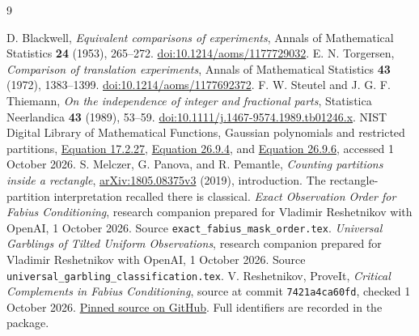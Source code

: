 \documentclass[11pt,a4paper]{article}
\theoremstyle{remark}\newtheorem*{ednote}{Editorial note (ProveIt, 2026-10-01)}
\begin{document}
\begin{thebibliography}{9}\small\raggedright
\setlength{\itemsep}{3pt}\setlength{\parskip}{0pt}
 D. Blackwell, \emph{Equivalent comparisons of experiments}, Annals of Mathematical Statistics \textbf{24} (1953), 265--272. \href{https://doi.org/10.1214/aoms/1177729032}{doi:10.1214/aoms/1177729032}.
 E. N. Torgersen, \emph{Comparison of translation experiments}, Annals of Mathematical Statistics \textbf{43} (1972), 1383--1399. \href{https://doi.org/10.1214/aoms/1177692372}{doi:10.1214/aoms/1177692372}.
 F. W. Steutel and J. G. F. Thiemann, \emph{On the independence of integer and fractional parts}, Statistica Neerlandica \textbf{43} (1989), 53--59. \href{https://doi.org/10.1111/j.1467-9574.1989.tb01246.x}{doi:10.1111/j.1467-9574.1989.tb01246.x}.
 NIST Digital Library of Mathematical Functions, Gaussian polynomials and restricted partitions, \href{https://dlmf.nist.gov/17.2#E27}{Equation 17.2.27}, \href{https://dlmf.nist.gov/26.9#E4}{Equation 26.9.4}, and \href{https://dlmf.nist.gov/26.9#E6}{Equation 26.9.6}, accessed 1 October 2026.
 S. Melczer, G. Panova, and R. Pemantle, \emph{Counting partitions inside a rectangle}, \href{https://arxiv.org/abs/1805.08375v3}{arXiv:1805.08375v3} (2019), introduction. The rectangle-partition interpretation recalled there is classical.
 \emph{Exact Observation Order for Fabius Conditioning}, research companion prepared for Vladimir Reshetnikov with OpenAI, 1 October 2026. Source \texttt{exact\_fabius\_mask\_order.tex}.
 \emph{Universal Garblings of Tilted Uniform Observations}, research companion prepared for Vladimir Reshetnikov with OpenAI, 1 October 2026. Source \texttt{universal\_garbling\_classification.tex}.
 V. Reshetnikov, ProveIt, \emph{Critical Complements in Fabius Conditioning}, source at commit \texttt{7421a4ca60fd}, checked 1 October 2026. \href{https://github.com/VladimirReshetnikov/ProveIt/blob/7421a4ca60fdf125411edf412f825aac54278b37/Analysis/FabiusFunction/docs/semi-formalized-research-frontiers/drafts/representations/Critical_Complements_Sharp_Information_Loss/article.tex}{Pinned source on GitHub}. Full identifiers are recorded in the package.
\end{thebibliography}
\end{document}
